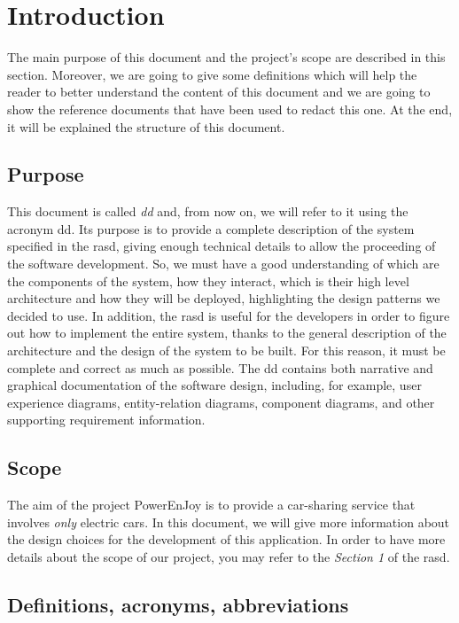 \section{Introduction} \label{sec:intro}

The main purpose of this document and the project's scope are described in this section. Moreover, we are going to give some definitions which will help the reader to better understand the content of this document and we are going to show the reference documents that have been used to redact this one. At the end, it will be explained the structure of this document.

\subsection{Purpose} \label{subsec:purpose}

This document is called \emph{\acl{dd}} and, from now on, we will refer to it using the acronym \acs{dd}. Its purpose is to provide a complete description of the system specified in the \acs{rasd}, giving enough technical details to allow the proceeding of the software development. So, we must have a good understanding of which are the components of the system, how they interact, which is their high level architecture and how they will be deployed, highlighting the design patterns we decided to use.
In addition, the \acs{rasd} is useful for the developers in order to figure out how to implement the entire system, thanks to the general description of the architecture and the design of the system to be built. For this reason, it must be complete and correct as much as possible.
The \acs{dd} contains both narrative and graphical documentation of the software design, including, for example, user experience diagrams, entity-relation diagrams, component diagrams, and other supporting requirement information.

\subsection{Scope} \label{subsec:scope}
The aim of the project PowerEnJoy is to provide a car-sharing service that involves \textit{only} electric cars. In this document, we will give more information about the design choices for the development of this application.
In order to have more details about the scope of our project, you may refer to the \textit{Section 1} of the \acl{rasd}.

\subsection{Definitions, acronyms, abbreviations} 
\label{subsec:def-ac}
